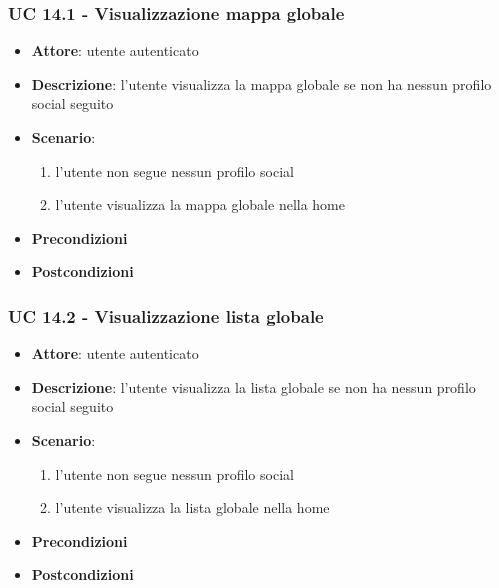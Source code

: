 \subsubsection{UC 14.1 - Visualizzazione mappa globale}
\begin{itemize}
    \item \textbf{Attore}: utente autenticato
    \item \textbf{Descrizione}: l’utente visualizza la mappa globale se non ha nessun profilo social seguito
    \item \textbf{Scenario}:
        \begin{enumerate}
            \item l’utente non segue nessun profilo social
            \item l’utente visualizza la mappa globale nella home
        \end{enumerate}

    \item \textbf{Precondizioni}
    \item \textbf{Postcondizioni}
\end{itemize}

\subsubsection{UC 14.2 - Visualizzazione lista globale}
\begin{itemize}
    \item \textbf{Attore}: utente autenticato
    \item \textbf{Descrizione}: l’utente visualizza la lista globale se non ha nessun profilo social seguito
    \item \textbf{Scenario}:
        \begin{enumerate}
            \item l’utente non segue nessun profilo social
            \item l’utente visualizza la lista globale nella home
        \end{enumerate}
    \item \textbf{Precondizioni}
    \item \textbf{Postcondizioni}
\end{itemize}

